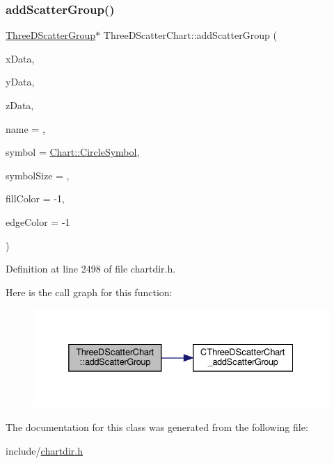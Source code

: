 \subsubsection{\texorpdfstring{add\+Scatter\+Group()}{addScatterGroup()}}
{\footnotesize\ttfamily \hyperlink{class_three_d_scatter_group}{Three\+D\+Scatter\+Group}$\ast$ Three\+D\+Scatter\+Chart\+::add\+Scatter\+Group (\begin{DoxyParamCaption}\item[{\hyperlink{class_double_array}{Double\+Array}}]{x\+Data,  }\item[{\hyperlink{class_double_array}{Double\+Array}}]{y\+Data,  }\item[{\hyperlink{class_double_array}{Double\+Array}}]{z\+Data,  }\item[{const char $\ast$}]{name = {},  }\item[{int}]{symbol = {\ttfamily \hyperlink{namespace_chart_a5392f7ff9dd37b8e092b2fe17dfb7d05af88026815a91b6dc7ca265a5b540cf74}{Chart\+::\+Circle\+Symbol}},  }\item[{int}]{symbol\+Size = {},  }\item[{int}]{fill\+Color = {\ttfamily -\/1},  }\item[{int}]{edge\+Color = {\ttfamily -\/1} }\end{DoxyParamCaption})\hspace{0.3cm}{\ttfamily [inline]}}



Definition at line 2498 of file chartdir.\+h.

Here is the call graph for this function\+:
\nopagebreak
\begin{figure}[H]
\begin{center}
\leavevmode
\includegraphics[width=332pt]{class_three_d_scatter_chart_a1e40cc9fd47aa15d5d463be0c32801e1_cgraph}
\end{center}
\end{figure}


The documentation for this class was generated from the following file\+:\begin{DoxyCompactItemize}
\item 
include/\hyperlink{chartdir_8h}{chartdir.\+h}\end{DoxyCompactItemize}
